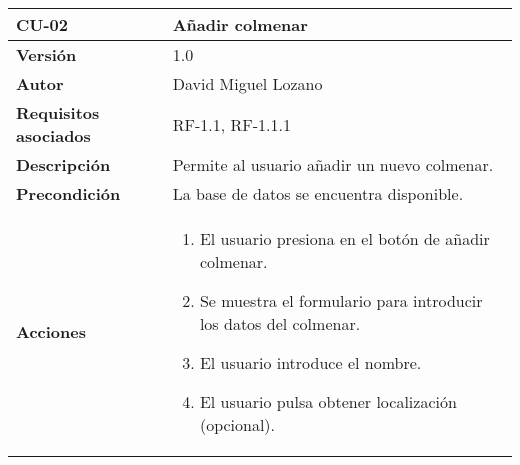 \begin{longtable}[H]{@{}ll@{}}
\toprule
\begin{minipage}[b]{0.24\columnwidth}\raggedright\strut
\textbf{CU-02}\strut
\end{minipage} & \begin{minipage}[b]{0.71\columnwidth}\raggedright\strut
\textbf{Añadir colmenar}\strut
\end{minipage}\tabularnewline
\midrule
\endhead
\begin{minipage}[t]{0.24\columnwidth}\raggedright\strut
\textbf{Versión}\strut
\end{minipage} & \begin{minipage}[t]{0.71\columnwidth}\raggedright\strut
1.0\strut
\end{minipage}\tabularnewline
\begin{minipage}[t]{0.24\columnwidth}\raggedright\strut
\textbf{Autor}\strut
\end{minipage} & \begin{minipage}[t]{0.71\columnwidth}\raggedright\strut
David Miguel Lozano\strut
\end{minipage}\tabularnewline
\begin{minipage}[t]{0.24\columnwidth}\raggedright\strut
\textbf{Requisitos asociados}\strut
\end{minipage} & \begin{minipage}[t]{0.71\columnwidth}\raggedright\strut
RF-1.1, RF-1.1.1\strut
\end{minipage}\tabularnewline
\begin{minipage}[t]{0.24\columnwidth}\raggedright\strut
\textbf{Descripción}\strut
\end{minipage} & \begin{minipage}[t]{0.71\columnwidth}\raggedright\strut
Permite al usuario añadir un nuevo colmenar.\strut
\end{minipage}\tabularnewline
\begin{minipage}[t]{0.24\columnwidth}\raggedright\strut
\textbf{Precondición}\strut
\end{minipage} & \begin{minipage}[t]{0.71\columnwidth}\raggedright\strut
La base de datos se encuentra disponible.\strut
\end{minipage}\tabularnewline
\begin{minipage}[t]{0.24\columnwidth}\raggedright\strut
\textbf{Acciones}\strut
\end{minipage} & \begin{minipage}[t]{0.71\columnwidth}\raggedright\strut
\begin{enumerate}
\def\labelenumi{\arabic{enumi}.}
\tightlist
\item
  El usuario presiona en el botón de añadir colmenar.
\item
  Se muestra el formulario para introducir los datos del colmenar.
\item
  El usuario introduce el nombre.
\item
  El usuario pulsa obtener localización (opcional).


\end{enumerate}
\end{minipage}
\end{longtable}
